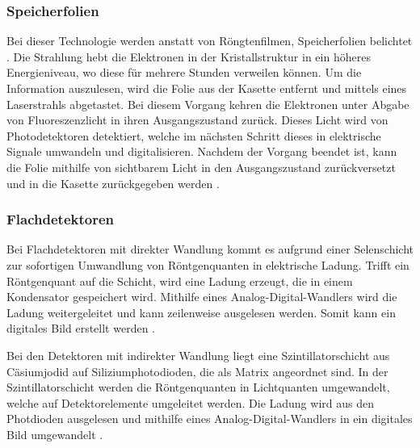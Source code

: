 \subsubsection{Speicherfolien}
\label{subsubsec:Speicherfolien}
Bei dieser Technologie werden anstatt von Röngtenfilmen, Speicherfolien belichtet \cite{MedizinischePhysik}. Die Strahlung hebt die Elektronen in der
Kristallstruktur in ein höheres Energieniveau, wo diese für mehrere Stunden verweilen können. Um die Information auszulesen, wird 
die Folie aus der Kasette entfernt und mittels eines Laserstrahls abgetastet. Bei diesem Vorgang kehren die Elektronen unter
Abgabe von Fluoreszenzlicht in ihren Ausgangszustand zurück. Dieses Licht wird von Photodetektoren detektiert, welche
im nächsten Schritt dieses in elektrische Signale umwandeln und digitalisieren. Nachdem der Vorgang beendet ist, kann die Folie 
mithilfe von sichtbarem Licht in den Ausgangszustand zurückversetzt und in die Kasette zurückgegeben werden \cite{Medizintechnik}.


\subsubsection{Flachdetektoren}
\label{subsubsec:Flachdetektoren}

Bei Flachdetektoren mit direkter Wandlung kommt es aufgrund einer Selenschicht zur sofortigen Umwandlung von Röntgenquanten in
elektrische Ladung. Trifft ein Röntgenquant auf die Schicht, wird eine Ladung erzeugt, die in einem Kondensator gespeichert wird. Mithilfe
eines Analog-Digital-Wandlers wird die Ladung weitergeleitet und kann zeilenweise ausgelesen werden. Somit kann ein digitales Bild
erstellt werden \cite{Artikel}. 

Bei den Detektoren mit indirekter Wandlung liegt eine Szintillatorschicht aus Cäsiumjodid auf Siliziumphotodioden, die als Matrix
angeordnet sind. In der Szintillatorschicht werden die Röntgenquanten in Lichtquanten umgewandelt, welche auf Detektorelemente umgeleitet 
werden. Die Ladung wird aus den Photdioden ausgelesen und mithilfe eines Analog-Digital-Wandlers in ein digitales Bild umgewandelt
 \cite{Artikel}.





